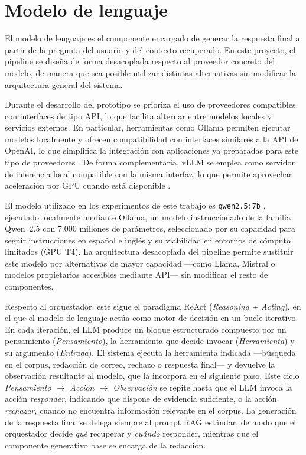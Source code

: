 \section{Modelo de lenguaje}\label{sec:modelo-lenguaje}

El modelo de lenguaje es el componente encargado de generar la respuesta final a partir de la pregunta del usuario y del contexto recuperado.
En este proyecto, el pipeline se diseña de forma desacoplada respecto al proveedor concreto del modelo, de manera que sea posible utilizar distintas alternativas sin modificar la arquitectura general del sistema.

Durante el desarrollo del prototipo se prioriza el uso de proveedores compatibles con interfaces de tipo API, lo que facilita alternar entre modelos locales y servicios externos.
En particular, herramientas como Ollama permiten ejecutar modelos localmente y ofrecen compatibilidad con interfaces similares a la API de OpenAI, lo que simplifica la integración con aplicaciones ya preparadas para este tipo de proveedores \cite{ollamaOpenAICompatibility}.
De forma complementaria, vLLM se emplea como servidor de inferencia local compatible con la misma interfaz, lo que permite aprovechar aceleración por GPU cuando está disponible \cite{kwon2023efficient}.

El modelo utilizado en los experimentos de este trabajo es \texttt{qwen2.5:7b} \cite{qwen2025}, ejecutado localmente mediante Ollama, un modelo instruccionado de la familia Qwen~2.5 con 7.000 millones de parámetros, seleccionado por su capacidad para seguir instrucciones en español e inglés y su viabilidad en entornos de cómputo limitados (GPU T4).
La arquitectura desacoplada del pipeline permite sustituir este modelo por alternativas de mayor capacidad —como Llama, Mistral o modelos propietarios accesibles mediante API— sin modificar el resto de componentes.

Respecto al orquestador, este sigue el paradigma ReAct \cite{yao2023react} (\textit{Reasoning + Acting}), en el que el modelo de lenguaje actúa como motor de decisión en un bucle iterativo.
En cada iteración, el LLM produce un bloque estructurado compuesto por un pensamiento (\textit{Pensamiento}), la herramienta que decide invocar (\textit{Herramienta}) y su argumento (\textit{Entrada}).
El sistema ejecuta la herramienta indicada —búsqueda en el corpus, redacción de correo, rechazo o respuesta final— y devuelve la observación resultante al modelo, que la incorpora en el siguiente paso.
Este ciclo \textit{Pensamiento $\to$ Acción $\to$ Observación} se repite hasta que el LLM invoca la acción \textit{responder}, indicando que dispone de evidencia suficiente, o la acción \textit{rechazar}, cuando no encuentra información relevante en el corpus.
La generación de la respuesta final se delega siempre al prompt RAG estándar, de modo que el orquestador decide \emph{qué} recuperar y \emph{cuándo} responder, mientras que el componente generativo base se encarga de la redacción.

